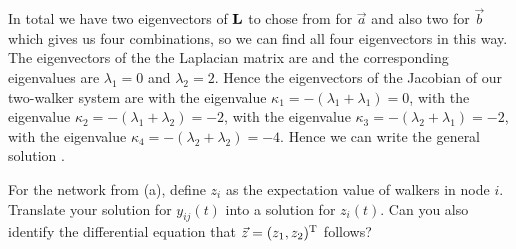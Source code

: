 In total we have two eigenvectors of $\bf L$ to chose from for $\vec{a}$ and also two for $\vec{b}$ which gives us four combinations, so we can find all four eigenvectors in this way. The eigenvectors of the the Laplacian matrix are 
and the corresponding eigenvalues are $\lambda_1=0$ and $\lambda_2=2$. Hence the eigenvectors of the Jacobian of our two-walker system are 
with the eigenvalue $\kappa_1=-(\lambda_1+\lambda_1)=0$,
with the eigenvalue $\kappa_2=-(\lambda_1+\lambda_2)=-2$,
with the eigenvalue $\kappa_3=-(\lambda_2+\lambda_1)=-2$,
with the eigenvalue $\kappa_4=-(\lambda_2+\lambda_2)=-4$.
Hence we can write the general solution 
.

\subquestion For the network from (a), define $z_i$ as the expectation value of walkers in node $i$. Translate your solution for $y_{ij}(t)$ into a solution for $z_i(t)$. Can you also identify the differential equation that $\vec{z}=(z_1,z_2)^{\rm T}$ follows?

